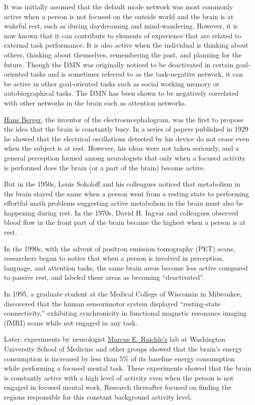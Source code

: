 It was initially assumed that the default mode network was most commonly active when a person is not focused on the outside world and the brain is at wakeful rest, such as during daydreaming and mind-wandering. However, it is now known that it can contribute to elements of experience that are related to external task performance. It is also active when the individual is thinking about others, thinking about themselves, remembering the past, and planning for the future. Though the DMN was originally noticed to be deactivated in certain goal-oriented tasks and is sometimes referred to as the task-negative network, it can be active in other goal-oriented tasks such as social working memory or autobiographical tasks. The DMN has been shown to be negatively correlated with other networks in the brain such as attention networks.

\href{https://en.wikipedia.org/wiki/Hans_Berger}{Hans Berger}, the inventor of the electroencephalogram, was the first to propose the idea that the brain is constantly busy. In a series of papers published in 1929 he showed that the electrical oscillations detected by his device do not cease even when the subject is at rest. However, his ideas were not taken seriously, and a general perception formed among neurologists that only when a focused activity is performed does the brain (or a part of the brain) become active.

But in the 1950s, Louis Sokoloff and his colleagues noticed that metabolism in the brain stayed the same when a person went from a resting state to performing effortful math problems suggesting active metabolism in the brain must also be happening during rest. In the 1970s, David H. Ingvar and colleagues observed blood flow in the front part of the brain became the highest when a person is at rest.

In the 1990s, with the advent of positron emission tomography (PET) scans, researchers began to notice that when a person is involved in perception, language, and attention tasks, the same brain areas become less active compared to passive rest, and labeled these areas as becoming ``deactivated''.

In 1995, a graduate student at the Medical College of Wisconsin in Milwaukee, discovered that the human sensorimotor system displayed ``resting-state connectivity,'' exhibiting synchronicity in functional magnetic resonance imaging (fMRI) scans while not engaged in any task.

Later, experiments by neurologist \href{https://en.wikipedia.org/wiki/Marcus_Raichle}{Marcus E. Raichle's} lab at Washington University School of Medicine and other groups showed that the brain's energy consumption is increased by less than 5\% of its baseline energy consumption while performing a focused mental task. These experiments showed that the brain is constantly active with a high level of activity even when the person is not engaged in focused mental work. Research thereafter focused on finding the regions responsible for this constant background activity level.

